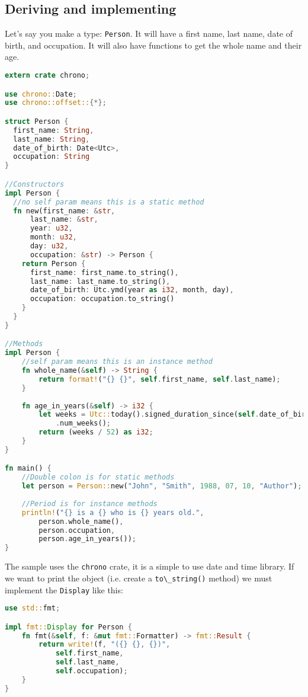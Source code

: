 \documentclass[a4paper,11pt]{article}
\begin{document}
\subsection{Deriving and implementing}
Let's say you make a type: \lstinline{Person}. It will have a first name, last name, date of birth, and occupation. It will also have functions to get the whole name and their age.

\begin{lstlisting}[language=Rust,frame=single]
extern crate chrono;

use chrono::Date;
use chrono::offset::{*};

struct Person {
  first_name: String,
  last_name: String,
  date_of_birth: Date<Utc>,
  occupation: String
}

//Constructors
impl Person {
  //no self param means this is a static method
  fn new(first_name: &str, 
      last_name: &str, 
      year: u32,
      month: u32, 
      day: u32, 
      occupation: &str) -> Person {
    return Person {
      first_name: first_name.to_string(),
      last_name: last_name.to_string(),
      date_of_birth: Utc.ymd(year as i32, month, day),
      occupation: occupation.to_string()
    }
  }
}

//Methods
impl Person {
    //self param means this is an instance method
    fn whole_name(&self) -> String {
        return format!("{} {}", self.first_name, self.last_name);
    }  
    
    fn age_in_years(&self) -> i32 {
        let weeks = Utc::today().signed_duration_since(self.date_of_birth)
            .num_weeks();
        return (weeks / 52) as i32;
    }
}

fn main() {
    //Double colon is for static methods
    let person = Person::new("John", "Smith", 1988, 07, 10, "Author");
    
    //Period is for instance methods
    println!("{} is a {} who is {} years old.", 
        person.whole_name(), 
        person.occupation, 
        person.age_in_years());
}
\end{lstlisting}

The sample uses the \lstinline{chrono} crate, it is a simple to use date and time library. 
If we want to print the object (i.e. create a \lstinline{to\_string()} method) we must implement the \lstinline{Display} like this:

\begin{lstlisting}[language=Rust,frame=single]
use std::fmt;

impl fmt::Display for Person {
    fn fmt(&self, f: &mut fmt::Formatter) -> fmt::Result {
        return write!(f, "({} {}, {})", 
            self.first_name, 
            self.last_name, 
            self.occupation);
    }
}
\end{lstlisting}
\end{document}
